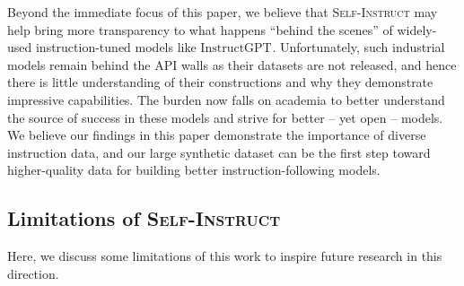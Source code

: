 \documentclass[11pt]{article}
\newcommand{\todo}[1]{{\color{red} [TODO: {#1}]}}
\newcommand{\yizhong}[1]{\textcolor{violet}{[YZ: #1]}}
\newcommand{\nascomment}[1]{\textcolor{blue}{\textbf{[#1 -- \textsc{nas}]}}}
\newcommand{\alisa}[1]{\textcolor{purple}{\textbf{[#1 -- \textsc{al}]}}}
\newcommand{\name}{\textsc{Self-Instruct}}
\newcommand{\gptinstruct}[1]{$\text{InstructGPT}_{\text{#1}}$}
\begin{document}
Beyond the immediate focus of this paper, we believe that \name{} may help bring more transparency to what happens ``behind the scenes'' of widely-used instruction-tuned models like \gptinstruct{}. 
Unfortunately, such industrial models remain behind the API walls as their datasets are not released, and hence there is little understanding of their constructions and why they demonstrate impressive capabilities.
The burden now falls on academia to better understand the source of success in these models and strive for better -- yet open -- models. We believe our findings in this paper demonstrate the importance of diverse instruction data, and our large synthetic dataset can be the first step toward higher-quality data for building better instruction-following models.




\subsection{Limitations of \name}
Here, we discuss some limitations of this work to inspire future research in this direction.  
\end{document}
